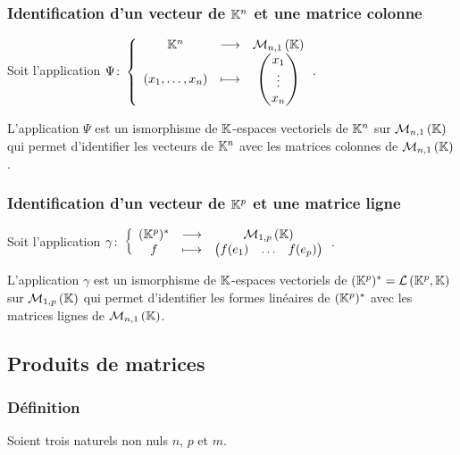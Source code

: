 \subsubsection{Identification d'un vecteur de \(\mathbb{K}^n\) et une matrice colonne}

Soit l'application 
\(\Psi\colon \left\{\begin{array}{ccc} \mathbb{K}^n & \longrightarrow &\mathcal{M}_{n,1}\left(\mathbb{K}\right)\\ (x_1,\ldots,x_n) & \longmapsto & \begin{pmatrix}x_1 \\ 
\vdots \\ x_n \end{pmatrix} \end{array} \right.\).

\begin{theo}
  L'application \(\Psi\) est un ismorphisme de \(\mathbb{K}\)-espaces vectoriels de 
  \(\mathbb{K}^n\) sur \(\mathcal{M}_{n,1}\left(\mathbb{K}\right)\) qui permet d'identifier les vecteurs de 
  \(\mathbb{K}^n\) avec les matrices colonnes de \(\mathcal{M}_{n,1}\left(\mathbb{K}\right)\).
\end{theo}

\subsubsection{Identification d'un vecteur de \(\mathbb{K}^p\) et une matrice ligne}

Soit l'application 
\(\gamma\colon \left\{\begin{array}{ccc} (\mathbb{K}^p)^{*} & \longrightarrow &\mathcal{M}_{1,p}\left(\mathbb{K}\right)\\ f & \longmapsto & \begin{pmatrix}f(e_1) & 
\ldots & f(e_p) \end{pmatrix} \end{array} \right.\).

\begin{theo}
  L'application \(\gamma\) est un ismorphisme de \(\mathbb{K}\)-espaces vectoriels de 
  \((\mathbb{K}^p)^{*}=\mathcal{L}\left(\mathbb{K}^p,\mathbb{K}\right)\) sur \(\mathcal{M}_{1,p}\left(\mathbb{K}\right)\) qui permet d'identifier 
  les formes linéaires de \((\mathbb{K}^p)^{*}\) avec les matrices lignes de 
  \(\mathcal{M}_{n,1}\left(\mathbb{K}\right)\).
\end{theo}

\subsection{Produits de matrices}

\subsubsection{Définition}

Soient trois naturels non nuls \(n\), \(p\) et \(m\).

